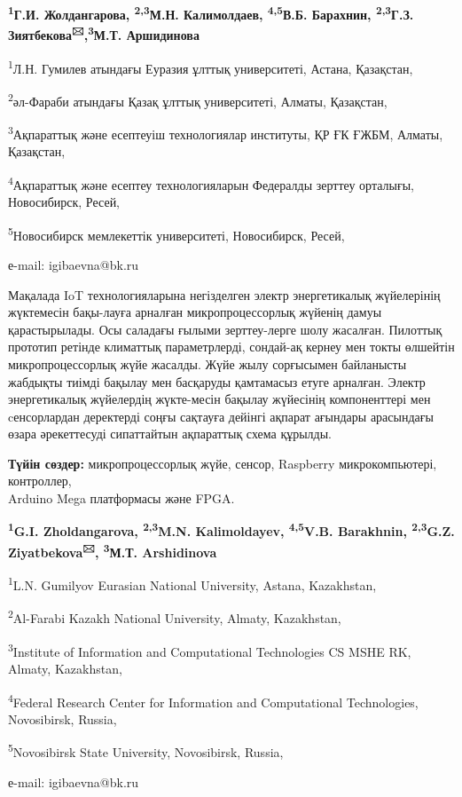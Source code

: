\begin{center}
{\bfseries \textsuperscript{1}Г.И. Жолдангарова, \textsuperscript{2,3}М.Н.
Калимолдаев, \textsuperscript{4,5}В.Б. Барахнин,
\textsuperscript{2,3}Г.З. Зиятбекова\textsuperscript{🖂},\textsuperscript{3}М.Т. Аршидинова}

\textsuperscript{1}Л.Н. Гумилев атындағы Еуразия ұлттық университеті,
Астана, Қазақстан,

\textsuperscript{2}әл-Фараби атындағы Қазақ ұлттық университеті, Алматы,
Қазақстан,

\textsuperscript{3}Ақпараттық және есептеуіш технологиялар институты, ҚР
ҒК ҒЖБМ, Алматы, Қазақстан,

\textsuperscript{4}Ақпараттық және есептеу технологияларын Федералды
зерттеу орталығы, Новосибирск, Ресей,

\textsuperscript{5}Новосибирск мемлекеттік университеті, Новосибирск,
Ресей,

е-mail: igibaevna@bk.ru
\end{center}

Мақалада IoT технологияларына негізделген электр энергетикалық
жүйелерінің жүктемесін бақы-лауға арналған микропроцессорлық жүйенің
дамуы қарастырылады. Осы саладағы ғылыми зерттеу-лерге шолу жасалған.
Пилоттық прототип ретінде климаттық параметрлерді, сондай-ақ кернеу мен
токты өлшейтін микропроцессорлық жүйе жасалды. Жүйе жылу сорғысымен
байланысты жабдықты тиімді бақылау мен басқаруды қамтамасыз етуге
арналған. Электр энергетикалық жүйелердің жүкте-месін бақылау жүйесінің
компоненттері мен cенсорлардан деректерді соңғы сақтауға дейінгі ақпарат
ағындары арасындағы өзара әрекеттесуді сипаттайтын ақпараттық схема
құрылды.

{\bfseries Түйін сөздер:} микропроцессорлық жүйе, сенсор, Raspberry
микрокомпьютері, контроллер, \\Arduino Mega платформасы және FPGA.



\begin{center}
{\bfseries \textsuperscript{1}G.I. Zholdangarova, \textsuperscript{2,3}M.N.
Kalimoldayev, \textsuperscript{4,5}V.B. Barakhnin,
\textsuperscript{2,3}G.Z. Ziyatbekova\textsuperscript{🖂}, \textsuperscript{3}М.Т. Arshidinova}

\textsuperscript{1}L.N. Gumilyov Eurasian National University, Astana,
Kazakhstan,

\textsuperscript{2}Al-Farabi Kazakh National University, Almaty,
Kazakhstan,

\textsuperscript{3}Institute of Information and Computational
Technologies CS MSHE RK, Almaty, Kazakhstan,

\textsuperscript{4}Federal Research Center for Information and
Computational Technologies, Novosibirsk, Russia,

\textsuperscript{5}Novosibirsk State University, Novosibirsk, Russia,

е-mail: igibaevna@bk.ru
\end{center}

